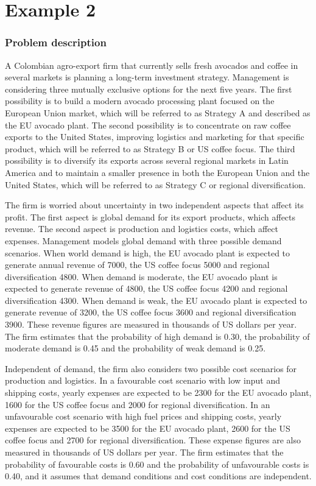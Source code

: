 \chapter{Example 2}\label{sec:example2}
	
	\subsection{Problem description}\label{subsec:example2-problem}
	
	A Colombian agro-export firm that currently sells fresh avocados and coffee in several markets is planning a
	long-term investment strategy. Management is considering three mutually exclusive options for the next five years.
	The first possibility is to build a modern avocado processing plant focused on the European Union market, which will
	be referred to as Strategy A and described as the EU avocado plant. The second possibility is to concentrate on
	raw coffee exports to the United States, improving logistics and marketing for that specific product, which will be
	referred to as Strategy B or US coffee focus. The third possibility is to diversify its exports across several
	regional markets in Latin America and to maintain a smaller presence in both the European Union and the United States,
	which will be referred to as Strategy C or regional diversification.
	
	\medskip
	The firm is worried about uncertainty in two independent aspects that affect its profit. The first aspect is global
	demand for its export products, which affects revenue. The second aspect is production and logistics costs, which
	affect expenses. Management models global demand with three possible demand scenarios. When world demand is high,
	the EU avocado plant is expected to generate annual revenue of 7000, the US coffee focus 5000 and regional
	diversification 4800. When demand is moderate, the EU avocado plant is expected to generate revenue of 4800, the
	US coffee focus 4200 and regional diversification 4300. When demand is weak, the EU avocado plant is expected to
	generate revenue of 3200, the US coffee focus 3600 and regional diversification 3900. These revenue figures are
	measured in thousands of US dollars per year. The firm estimates that the probability of high demand is 0.30, the
	probability of moderate demand is 0.45 and the probability of weak demand is 0.25.
	
	\medskip
	Independent of demand, the firm also considers two possible cost scenarios for production and logistics. In a
	favourable cost scenario with low input and shipping costs, yearly expenses are expected to be 2300 for the EU
	avocado plant, 1600 for the US coffee focus and 2000 for regional diversification. In an unfavourable cost
	scenario with high fuel prices and shipping costs, yearly expenses are expected to be 3500 for the EU avocado plant,
	2600 for the US coffee focus and 2700 for regional diversification. These expense figures are also measured in
	thousands of US dollars per year. The firm estimates that the probability of favourable costs is 0.60 and the
	probability of unfavourable costs is 0.40, and it assumes that demand conditions and cost conditions are independent.
	
